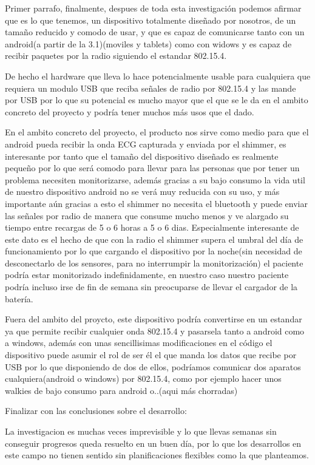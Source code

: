 		Primer parrafo, finalmente, despues de toda esta investigación podemos afirmar que es lo que tenemos, un dispositivo totalmente diseñado por nosotros, de un tamaño reducido y comodo de usar, y que es capaz de comunicarse tanto con un android(a partir de la 3.1)(moviles y tablets) como con widows y es capaz de recibir paquetes por la radio siguiendo el estandar 802.15.4. 

		De hecho el hardware que lleva lo hace potencialmente usable para cualquiera que requiera un modulo USB que reciba señales de radio por 802.15.4 y las mande por USB por lo que su potencial es mucho mayor que el que se le da en el ambito concreto del proyecto y podría tener muchos más usos que el dado.

		En el ambito concreto del proyecto, el producto nos sirve como medio para que el android pueda recibir la onda ECG capturada y enviada por el shimmer, es interesante por tanto que el tamaño del dispositivo diseñado es realmente pequeño por lo que será comodo para llevar para las personas que por tener un problema necesiten monitorizarse, además gracias a su bajo consumo la vida util de nuestro dispositivo android no se verá muy reducida con su uso, y más importante aún  gracias a esto el shimmer no necesita el bluetooth y puede enviar las señales por radio de manera que consume mucho menos y ve alargado su tiempo entre recargas de 5 o 6 horas a 5 o 6 dias. Especialmente interesante de este dato es el hecho de que con la radio el shimmer supera el umbral del día de funcionamiento por lo que cargando el dispositivo por la noche(sin necesidad de desconectarlo de los sensores, para no interrumpir la monitorización) el paciente podría estar monitorizado indefinidamente, en nuestro caso nuestro paciente podría incluso irse de fin de semana sin preocuparse de llevar el cargador de la batería.

		Fuera del ambito del proycto, este dispositivo podría convertirse en un estandar ya que permite recibir cualquier onda 802.15.4 y pasarsela tanto a android como a windows, además con unas sencillisimas modificaciones en el código el dispositivo puede asumir el rol de ser él el que manda los datos que recibe por USB por lo que disponiendo de dos de ellos, podríamos comunicar dos aparatos cualquiera(android o windows) por 802.15.4, como por ejemplo hacer unos walkies de bajo consumo para android o..(aqui más chorradas)

		Finalizar con las conclusiones sobre el desarrollo:

		La investigacion es muchas veces imprevisible y lo que llevas semanas sin conseguir progresos queda resuelto en un buen día, por lo que los desarrollos en este campo no tienen sentido sin planificaciones flexibles como la que planteamos. 

